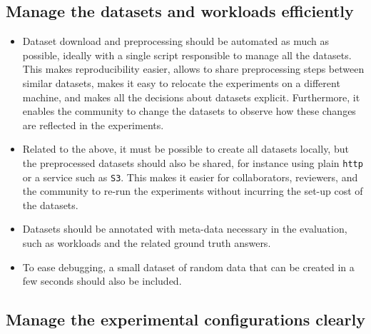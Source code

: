 \documentclass{llncs}
\begin{document}
\subsection{Manage the datasets and workloads efficiently}

\begin{itemize}
\item Dataset download and preprocessing should be automated as much as possible,
  ideally with a single script responsible to manage all the datasets.
  This makes reproducibility easier, allows to share preprocessing steps between similar datasets,
  makes it easy to relocate the experiments on a different machine, and makes all the
  decisions about datasets explicit.
  Furthermore, it enables the community to change the datasets to observe how these changes
  are reflected in the experiments.
\item Related to the above, it must be possible to create all datasets locally, 
  but the preprocessed datasets should also be shared, for instance using plain 
  \texttt{http} or a service such as \texttt{S3}.
  This makes it easier for collaborators, reviewers, and the community to re-run the
  experiments without incurring the set-up cost of the datasets.
\item Datasets should be annotated with meta-data necessary in the evaluation, 
  such as workloads and the related ground truth answers.
\item To ease debugging, a small dataset of random data that can be created in a few
  seconds should also be included.
\end{itemize}


\subsection{Manage the experimental configurations clearly}
\end{document}
